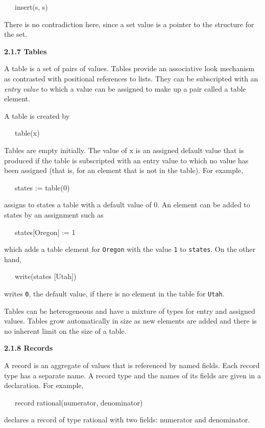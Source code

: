 {\ttfamily\mdseries
\ \ \ insert(s, s)}

There is no contradiction here, since a set value is a pointer to the
structure for the set.

{\sffamily\bfseries
2.1.7 Tables}

A table is a set of pairs of values. Tables provide an associative
look mechanism as contrasted with positional references to lists. They
can be subscripted with an \textit{entry value }to which a value can
be assigned to make up a pair called a table element.

A table is created by

{\ttfamily\mdseries
\ \ \ table(x)}


Tables are empty initially. The value of x is an assigned default
value that is produced if the table is subscripted with an entry value
to which no value has been assigned (that is, for an element that is
not in the table). For example,

{\ttfamily\mdseries
\ \ \ states := table(0)}

\noindent assigns to states a table with a default value of 0. An
element can be added to states by an assignment such as

{\ttfamily\mdseries
\ \ \ states[{\textquotedbl}Oregon{\textquotedbl}] := 1}

\noindent which adds a table element for
\texttt{{\textquotedbl}Oregon{\textquotedbl}} with the value
\texttt{1} to \texttt{states}. On the other hand,

{\ttfamily\mdseries
\ \ \ write(states [{\textquotedbl}Utah{\textquotedbl}])}

\noindent writes \texttt{0}, the default value, if there is no element
in the table for \texttt{{\textquotedbl}Utah{\textquotedbl}}.

Tables can be heterogeneous and have a mixture of types for entry and
assigned values. Tables grow automatically in size as new elements are
added and there is no inherent limit on the size of a table.

{\sffamily\bfseries
2.1.8 Records}

A record is an aggregate of values that is referenced by named
fields. Each record type has a separate name. A record type and the
names of its fields are given in a declaration. For example,

{\ttfamily\mdseries
\ \ \ record rational(numerator, denominator)}

\noindent
declares a record of type rational with two fields: numerator and denominator.


